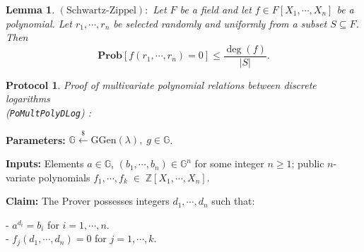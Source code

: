 \documentclass[11pt, lettersize, notitlepage, leqno, footskip=0.6cm]{article}
\newcommand{\bz}{\mathbb Z}
\newcommand{\mb}{\mathbb}
\newcommand{\mbf}{\mathbf}
\newcommand{\mr}{\mathrm}
\newcommand{\lamb}{\lambda}
\newcommand{\sub}{\subseteq}
\newtheorem{Lem}[Thm]{Lemma}
\newtheorem{Prot}[Thm]{Protocol}
\numberwithin{equation}{section}
\begin{document}
\begin{Lem} $\mr{(Schwartz\text{-}Zippel)}:$ Let $F$ be a field and let $f\in F[X_1,\cdots,X_n]$ be a polynomial. Let $r_1,\cdots,r_n$ be selected randomly and uniformly from a subset $S\sub F$. Then \vspace{-0.1cm}$$\mbf{Prob}[f(r_1,\cdots, r_n) = 0] \leq \frac{\deg(f)}{|S|}.$$\end{Lem}


\vspace{0.1cm}

\begin{Prot} \normalfont \textit{Proof of multivariate polynomial relations between discrete logarithms}\\ (\verb|PoMultPolyDLog|) :\end{Prot} \vspace{-0.3cm}

\noindent \textbf{Parameters:} $\mb{G}\xleftarrow{\$} \mr{GGen}(\lamb), \; g\in \mb{G}$.

\noindent \textbf{Inputs:} Elements $a\in\mb{G} $, $(b_1,\cdots,b_n)\in \mb{G}^n$ for some integer $n\geq 1$; public $n$-variate polynomials $f_1,\cdots,f_k\;\in\; \bz[X_1,\cdots,X_n]$.

\noindent \textbf{Claim:} The Prover possesses integers $d_1,\cdots, d_n$ such that:

\noindent- $a^{d_i} = b_i$ for $i = 1,\cdots, n$.\\
- $f_j(d_1,\cdots,d_n) = 0$ for $j = 1,\cdots, k$.
\end{document}
